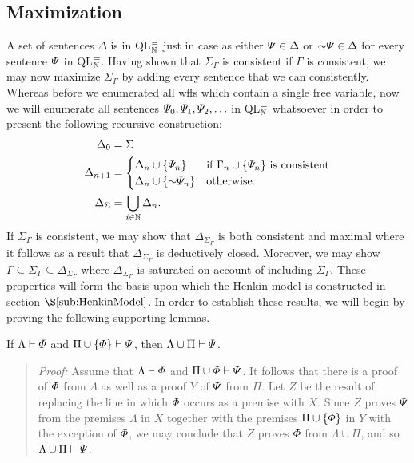 \subsection{Maximization}%
  \label{sub:Maximization}
  
A set of sentences $\Delta$ is  in QL$^=_{\mathbb{N}}$ just in case as either $\varPsi\in\Delta$ or $\enot\metaB\in\Delta$ for every sentence $\varPsi$ in QL$^=_{\mathbb{N}}$.
Having shown that $\Sigma_\Gamma$ is consistent if $\Gamma$ is consistent, we may now maximize $\Sigma_\Gamma$ by adding every sentence that we can consistently. 
Whereas before we enumerated all wffs which contain a single free variable, now we will enumerate all sentences $\varPsi_0,\varPsi_1,\varPsi_2,\ldots$ in QL$^=_{\mathbb{N}}$ whatsoever in order to present the following recursive construction:
\begin{align*}
  \Delta_0     &= \Sigma \\
  \Delta_{n+1} &= 
    \begin{cases}
      \Delta_n\cup\set{\metaB_n} &\text{if } \Gamma_n\cup\set{\metaB_n} \text{ is consistent}\\
      \Delta_n\cup\set{\enot\metaB_n} &\text{otherwise}.
    \end{cases}\\
  \Delta_\Sigma &= \bigcup_{i\in\N}\Delta_n. 
\end{align*}
If $\Sigma_\Gamma$ is consistent, we may show that $\Delta_{\Sigma_\Gamma}$ is both consistent and maximal where it follows as a result that $\Delta_{\Sigma_\Gamma}$ is deductively closed.
Moreover, we may show $\Gamma\subseteq\Sigma_\Gamma\subseteq\Delta_{\Sigma_\Gamma}$ where $\Delta_{\Sigma_\Gamma}$ is saturated on account of including $\Sigma_\Gamma$.
These properties will form the basis upon which the Henkin model is constructed in section $\S\ref{sub:HenkinModel}$.
In order to establish these results, we will begin by proving the following supporting lemmas.




\begin{Lthm} \label{lemma:prcut}
  If $\Lambda \vdash \varPhi$ and $\Pi\cup\lbrace\varPhi\rbrace \vdash \varPsi$, then $\Lambda\cup\Pi \vdash \varPsi$. 
\end{Lthm}

\begin{quote} 
  \textit{Proof:} Assume that $\Lambda \vdash \varPhi$ and $\Pi\cup{\ensuremath{\varPhi}} \vdash \varPsi$.
  It follows that there is a proof of $\varPhi$ from $\Lambda$ as well as a proof $Y$ of $\varPsi$ from $\Pi$. 
  Let $Z$ be the result of replacing the line in which $\varPhi$ occurs as a premise with $X$.
  Since $Z$ proves $\varPsi$ from the premises $\Lambda$ in $X$ together with the premises $\Pi\cup\lbrace\varPhi\rbrace$ in $Y$ with the exception of $\varPhi$, we may conclude that $Z$ proves $\varPhi$ from $\Lambda\cup\Pi$, and so $\Lambda\cup\Pi\vdash\varPsi$.
\end{quote}




